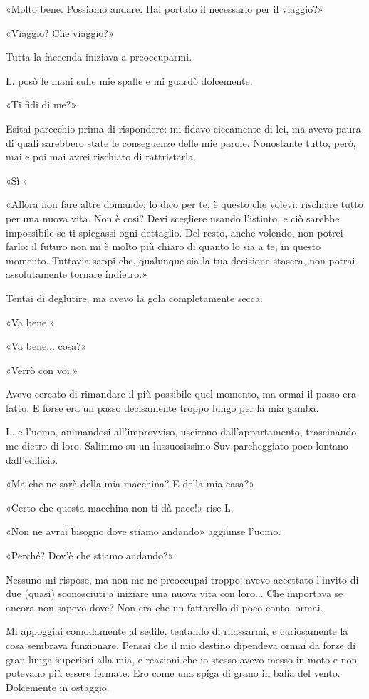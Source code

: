 \documentclass[a4paper,12pt]{book}
\begin{document}
«Molto bene. Possiamo andare. Hai portato il necessario per il viaggio?»

«Viaggio? Che viaggio?»

Tutta la faccenda iniziava a preoccuparmi.

L. posò le mani sulle mie spalle e mi guardò dolcemente.

«Ti fidi di me?»

Esitai parecchio prima di rispondere: mi fidavo ciecamente di lei, ma avevo
paura di quali sarebbero state le conseguenze delle mie parole. Nonostante
tutto, però, mai e poi mai avrei rischiato di rattristarla.

«Sì.»

«Allora non fare altre domande; lo dico per te, è questo che volevi: rischiare
tutto per una nuova vita. Non è così? Devi scegliere usando l’istinto, e
ciò sarebbe impossibile se ti spiegassi ogni dettaglio. Del resto, anche
volendo, non potrei farlo: il futuro non mi è molto più chiaro di quanto lo
sia a te, in questo momento. Tuttavia sappi che, qualunque sia la tua decisione
stasera, non potrai assolutamente tornare indietro.»

Tentai di deglutire, ma avevo la gola completamente secca.

«Va bene.»

«Va bene... cosa?»

«Verrò con voi.»

Avevo cercato di rimandare il più possibile quel momento, ma ormai il passo era
fatto. E forse era un passo decisamente troppo lungo per la mia gamba.

L. e l’uomo, animandosi all’improvviso, uscirono dall’appartamento,
trascinando me dietro di loro. Salimmo su un lussuosissimo Suv parcheggiato poco
lontano dall’edificio.

«Ma che ne sarà della mia macchina? E della mia casa?»

«Certo che questa macchina non ti dà pace!» rise L.

«Non ne avrai bisogno dove stiamo andando» aggiunse l’uomo.

«Perché? Dov’è che stiamo andando?»

Nessuno mi rispose, ma non me ne preoccupai troppo: avevo accettato l’invito
di due (quasi) sconosciuti a iniziare una nuova vita con loro... Che importava
se ancora non sapevo dove? Non era che un fattarello di poco conto, ormai.

Mi appoggiai comodamente al sedile, tentando di rilassarmi, e curiosamente la
cosa sembrava funzionare. Pensai che il mio destino dipendeva ormai da forze di
gran lunga superiori alla mia, e reazioni che io stesso avevo messo in moto e
non potevano più essere fermate. Ero come una spiga di grano in balia del
vento. Dolcemente in ostaggio.
\end{document}
